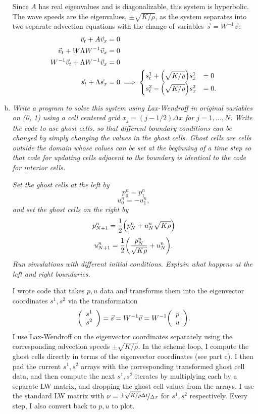 \documentclass[12pt]{article}
\begin{document}
\begin{enumerate}[(a)]
Since $A$ has real eigenvalues and is diagonalizable, this system is hyperbolic.  The wave speeds are the eigenvalues, $\pm\sqrt{K/\rho}$, as the system separates into two separate advection equations with the change of variables $\vec{s} = W^{-1}\vec{v}:$
\begin{align*}
\vec{v}_t + A \vec{v}_x &= 0 \\
 \vec{v}_t + W\Lambda W^{-1} \vec{v}_x &= 0 \\
 W^{-1}\vec{v}_t + \Lambda W^{-1} \vec{v}_x &= 0 \\
\vec{s}_t + \Lambda \vec{s}_x &= 0 \implies
\begin{cases}
s^1_t + \qty(\sqrt{K/\rho}) s^1_x &= 0 \\ 
s^2_t - \qty(\sqrt{K/\rho})s^2_x &= 0.\end{cases}\end{align*}
\item \emph{Write a program to solve this system using Lax-Wendroff in original variables on (0, 1) using a cell centered grid $x_j = (j - 1/2)\Delta x $ for $j = 1,\dots, N$. Write the code to use ghost cells, so that different boundary conditions can be changed by simply changing the values in the ghost cells. Ghost cells are cells outside the domain whose values can be set at the beginning of a time step so that code for updating cells adjacent to the boundary is identical to the code for interior cells.}

\emph{Set the ghost cells at the left by }
$$p_0^n = p_1^n $$
$$u_0^n = -u_1^n,$$
\emph{and set the ghost cells on the right by}
$$p_{N+1}^n = \frac{1}{2}\qty(p_N^n + u_N^n \sqrt{K\rho})$$
$$u_{N+1}^n = \frac{1}{2} \qty(\dfrac{p_N^n}{\sqrt{K\rho}} + u_N^n). $$
\emph{Run simulations with different initial conditions. Explain what happens at the left and right boundaries.}

I wrote code that takes $p,u$ data and transforms them into the eigenvector coordinates $s^1, s^2$ via the transformation 
$$\qty(\begin{array}{c} s^1 \\ s^2 \end{array}) = \vec{s} = W^{-1}\vec{v} = W^{-1} \qty(\begin{array}{c} p \\ u \end{array}).$$  
I use Lax-Wendroff on the eigenvector coordinates separately using the corresponding advection speeds $\pm\sqrt{K/\rho}$.  In the scheme loop, I compute the ghost cells directly in terms of the eigenvector coordinates (see part c). I then pad the current $s^1, s^2$ arrays with the corresponding transformed ghost cell data, and then compute the next $s^1, s^2$ iterates by multiplying each by a separate LW matrix, and dropping the ghost cell values from the arrays.  I use the standard LW matrix with $\nu = \nicefrac{\pm\sqrt{K/\rho} \Delta t}{\Delta x}$ for $s^1, s^2$ respectively. Every step, I also convert back to $p,u$ to plot.


\end{enumerate}
\end{document}
